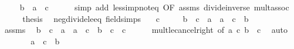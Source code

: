 \begin{isabellebody}
\ \isamarkupfalse%
\ {\isachardoublequoteopen}{\isachardot}{\kern0pt}{\isachardot}{\kern0pt}{\isachardot}{\kern0pt}\ {\isasymlongleftrightarrow}\ b\ {\isacharless}{\kern0pt}\ a\ {\isacharasterisk}{\kern0pt}\ c{\isachardoublequoteclose}\isanewline
\ \ \ \ \isamarkupfalse%
\ {\isacharparenleft}{\kern0pt}simp\ add{\isacharcolon}{\kern0pt}\ less{\isacharunderscore}{\kern0pt}imp{\isacharunderscore}{\kern0pt}not{\isacharunderscore}{\kern0pt}eq{}\ {\isacharbrackleft}{\kern0pt}OF\ assms{\isacharbrackright}{\kern0pt}\ divide{\isacharunderscore}{\kern0pt}inverse\ mult{\isachardot}{\kern0pt}assoc{\isacharparenright}{\kern0pt}\isanewline
\ \ \isamarkupfalse%
\ \isamarkupfalse%
\ {\isacharquery}{\kern0pt}thesis\ \isacommand{{\isachardot}{\kern0pt}}\isamarkupfalse%
\isanewline
{}\isamarkupfalse%
%
\endisatagproof
{\isafoldproof}%
%
\isadelimproof
\isanewline
%
\endisadelimproof
\isanewline
{}\isamarkupfalse%
\ neg{\isacharunderscore}{\kern0pt}divide{\isacharunderscore}{\kern0pt}le{\isacharunderscore}{\kern0pt}eq\ {\isacharbrackleft}{\kern0pt}field{\isacharunderscore}{\kern0pt}simps{\isacharbrackright}{\kern0pt}{\isacharcolon}{\kern0pt}\isanewline
\ \ \ {\isachardoublequoteopen}c\ {\isacharless}{\kern0pt}\ {}{\isachardoublequoteclose}\isanewline
\ \ \ {\isachardoublequoteopen}b\ {\isacharslash}{\kern0pt}\ c\ {\isasymle}\ a\ {\isasymlongleftrightarrow}\ a\ {\isacharasterisk}{\kern0pt}\ c\ {\isasymle}\ b{\isachardoublequoteclose}\isanewline
%
\isadelimproof
%
\endisadelimproof
%
\isatagproof
{}\isamarkupfalse%
\ {\isacharminus}{\kern0pt}\isanewline
\ \ \isamarkupfalse%
\ assms\ \isamarkupfalse%
\ {\isachardoublequoteopen}b\ {\isacharslash}{\kern0pt}\ c\ {\isasymle}\ a\ {\isasymlongleftrightarrow}\ a\ {\isacharasterisk}{\kern0pt}\ c\ {\isasymle}\ {\isacharparenleft}{\kern0pt}b\ {\isacharslash}{\kern0pt}\ c{\isacharparenright}{\kern0pt}\ {\isacharasterisk}{\kern0pt}\ c{\isachardoublequoteclose}\isanewline
\ \ \ \ \isamarkupfalse%
\ mult{\isacharunderscore}{\kern0pt}le{\isacharunderscore}{\kern0pt}cancel{\isacharunderscore}{\kern0pt}right\ {\isacharbrackleft}{\kern0pt}of\ a\ c\ {\isachardoublequoteopen}b\ {\isacharslash}{\kern0pt}\ c{\isachardoublequoteclose}{\isacharbrackright}{\kern0pt}\ \isamarkupfalse%
\ auto\isanewline
\ \ \isamarkupfalse%
\ \isamarkupfalse%
\ {\isachardoublequoteopen}{\isachardot}{\kern0pt}{\isachardot}{\kern0pt}{\isachardot}{\kern0pt}\ {\isasymlongleftrightarrow}\ a\ {\isacharasterisk}{\kern0pt}\ c\ {\isasymle}\ b{\isachardoublequoteclose}\isanewline

\end{isabellebody}
